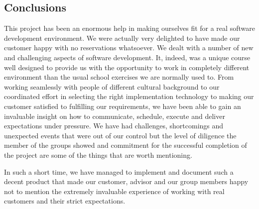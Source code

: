 \subsection{Conclusions}
This project has been an enormous help in making ourselves fit for a real software development environment. We were actually very delighted to have made our customer happy with no reservations whatsoever. We dealt with a number of new and challenging aspects of software development. It, indeed, was a unique course well designed to provide us with the opportunity to work in completely different environment than the usual school exercises we are normally used to. From working seamlessly with people of different cultural background to our coordinated effort in selecting the right implementation technology to making our customer satisfied to fulfilling our requirements, we have been able to gain an invaluable insight on how to communicate, schedule, execute and deliver expectations under pressure. We have had challenges, shortcomings and unexpected events that were out of our control but the level of diligence the member of the groups showed and commitment for the successful completion of the project are some of the things that are worth mentioning.

In such a short time, we have managed to implement and document such a decent product that made our customer, advisor and our group members happy not to mention the extremely invaluable experience of working with real customers and their strict expectations. 